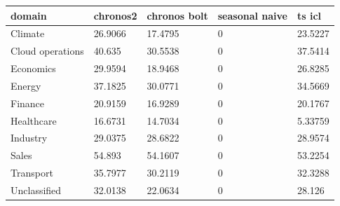 \begin{tabular}{lllll}
\toprule
domain & chronos2 & chronos bolt & seasonal naive & ts icl \\
\midrule
Climate & 26.9066 & 17.4795 & 0 & 23.5227 \\
Cloud operations & 40.635 & 30.5538 & 0 & 37.5414 \\
Economics & 29.9594 & 18.9468 & 0 & 26.8285 \\
Energy & 37.1825 & 30.0771 & 0 & 34.5669 \\
Finance & 20.9159 & 16.9289 & 0 & 20.1767 \\
Healthcare & 16.6731 & 14.7034 & 0 & 5.33759 \\
Industry & 29.0375 & 28.6822 & 0 & 28.9574 \\
Sales & 54.893 & 54.1607 & 0 & 53.2254 \\
Transport & 35.7977 & 30.2119 & 0 & 32.3288 \\
Unclassified & 32.0138 & 22.0634 & 0 & 28.126 \\
\bottomrule
\end{tabular}
